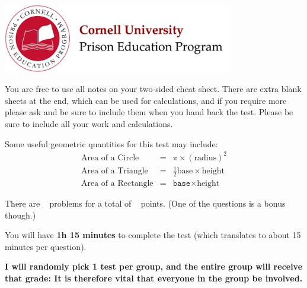 \documentclass[addpoints,12pt]{exam}
\begin{document}

\begin{flushright}
\vspace{0.1in}

\vspace{0.1in}

\vspace{0.1in}
\end{flushright}

\vspace{0.2in}

\begin{center}
\includegraphics[width=10cm]{../images/logo.png}
\end{center}

\begin{center}
\end{center}

\vspace{0.5in}

\begin{large}
You are free to use all notes on your two-sided cheat sheet. There are extra blank sheets at the end, which can be used for calculations, and if you require more please ask and be sure to include them when you hand back the test. Please be sure to include all your work and calculations.

Some useful geometric quantities for this test may include:
\begin{eqnarray}
\textrm{Area of a Circle} &=& \pi\times(\textrm{radius})^2 \nonumber \\
\textrm{Area of a Triangle} &=& \frac{1}{2}\textrm{base}\times\textrm{height}  \nonumber \\
\textrm{Area of a Rectangle} &=& \texttt{base}\times\textrm{height}\nonumber
\end{eqnarray}

There are \numquestions ~ problems for a total of \numpoints ~ points. (One of the questions is a bonus though.)

You will have \textbf{1h 15 minutes} to complete the test (which translates to about 15 minutes per question).

\textbf{I will randomly pick 1 test per group, and the entire group will receive that grade: It is therefore vital that everyone in the group be involved.}

\end{large}
\vspace{0.2in}
\end{document}
